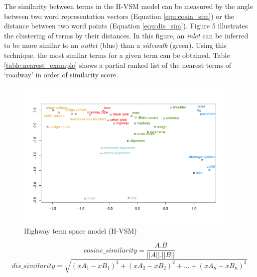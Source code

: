 \documentclass[Journal, BackFigs, DoubleSpace]{ascelike} %
\begin{document}
\par
The similarity between terms in the H-VSM model can be measured by the angle between two word representation vectors (Equation \ref{equ:cosin_sim}) or the distance between two word points (Equation \ref{equ:dis_sim}). Figure 5 illustrates the clustering of terms by their distances. In this figure, an \textit{inlet} can be inferred to be more similar to an \textit{outlet} (blue) than a \textit{sidewalk} (green). Using this technique, the most similar terms for a given term can be obtained. Table \ref{table:nearest_example} shows a partial ranked list of the nearest terms of `roadway' in order of similarity score.
%
\begin{figure}[t]
	\centering
	\includegraphics[width=0.95\textwidth]{Figure5_hvsm_space}
	\caption{Highway term space model (H-VSM)}
	\label{fig:hvsm}
\end{figure}
%
\begin{equation}
\label{equ:cosin_sim}
cosine\_similarity = \frac{A.B}{||A||.||B||}
\end{equation}
%
\begin{equation}
\label{equ:dis_sim}
dis\_similarity =\sqrt{(xA_1-xB_1)^2+(xA_2-xB_2)^2+...+(xA_n-xB_n)^2}
\end{equation}
\end{document}

